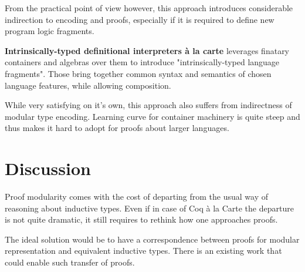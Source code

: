 \documentclass[sigplan,nonacm]{acmart}
\begin{document}
From the practical point of view however, this approach introduces considerable indirection to encoding and proofs, especially if it is required to define new program logic fragments.



\medskip
\textbf{Intrinsically-typed definitional interpreters {\`a} la carte}\cite{van2022intrinsically} leverages finatary containers\cite{altenkirch2015indexed} and algebras over them to introduce "intrinsically-typed language fragments".
Those bring together common syntax and semantics of chosen language features, while allowing composition. 

While very satisfying on it's own, this approach also suffers from indirectness of modular type encoding. Learning curve for container machinery is quite steep and thus makes it hard to adopt for proofs about larger languages.




\medskip

\section{Discussion}

Proof modularity comes with the cost of departing from the usual way of reasoning about inductive types. 
Even if in case of Coq à la Carte the departure is not quite dramatic, it still requires to rethink how one approaches proofs.

The ideal solution would be to have a correspondence between proofs for modular representation and equivalent inductive types. 
There is an existing work\cite{cohen2024trocq} that could enable such transfer of proofs. 






\appendix
\end{document}
